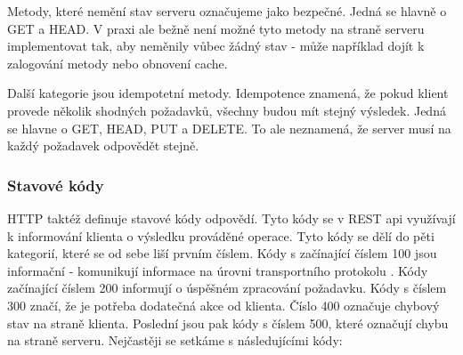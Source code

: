 \documentclass[thesis=M,czech]{FITthesis}[2019/12/23]
\begin{document}
Metody, které nemění stav serveru označujeme jako bezpečné. Jedná se hlavně o GET a HEAD. V praxi ale bežně není možné tyto metody na straně serveru implementovat tak, aby neměnily vůbec žádný stav - může například dojít k zalogování metody nebo obnovení cache.

Další kategorie jsou idempotetní metody. Idempotence znamená, že pokud klient provede několik shodných požadavků, všechny budou mít stejný výsledek. Jedná se hlavne o GET, HEAD, PUT a DELETE. To ale neznamená, že server musí na každý požadavek odpovědět stejně.


\subsubsection*{Stavové kódy}
HTTP taktéž definuje stavové kódy odpovědí. Tyto kódy se v REST api využívají k informování klienta o výsledku prováděné operace. Tyto kódy se dělí do pěti kategorií, které se od sebe liší prvním číslem. Kódy s začínající číslem 100 jsou informační - komunikují informace na úrovni transportního protokolu \cite{http_codes}. Kódy začínající číslem 200 informují o úspěšném zpracování požadavku. Kódy s číslem 300 značí, že je potřeba dodatečná akce od klienta. Číslo 400 označuje chybový stav na straně klienta. Poslední jsou pak kódy s číslem 500, které označují chybu na straně serveru. Nejčastěji se setkáme s následujícími kódy:
\end{document}
